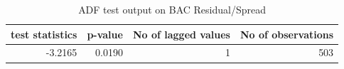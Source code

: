 \begin{table}[!ht] 
\centering 
\resizebox{0.7\textwidth}{!} { 
\begin{tabular}{rrrr}
\toprule
test statistics & p-value & No of lagged values & No of observations \\
\midrule
-3.2165 & 0.0190 & 1 & 503 \\
\bottomrule
\end{tabular}} 
\caption {ADF test output on BAC Residual/Spread} 
\label {adf_bac_pnc} 
\end{table} 
\FloatBarrier